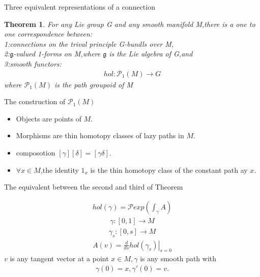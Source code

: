 \documentclass[12pt,aspectratio=53,mathserif]{beamer}
\begin{document}
\begin{frame}
     {Three equivalent representations of a connection}
     \newtheorem{mythm}{Theorem}
     \begin{mythm}\label{cc}
        For any Lie group G and any smooth manifold M,there is a one to one correspondence between:\\
        1:connections on the trival principle G-bundls over M,\\
        2:$\mathfrak{g}$-valued 1-forms on M,where $\mathfrak{g}$ is the Lie algebra of G,and\\
        3:smooth functors:
    \begin{align*}
    hol :\mathcal{P}_1(M) \rightarrow G
\end{align*}
       where $\mathcal{P}_1(M)$ is the path groupoid of M
     \end{mythm}
\end{frame}

\begin{frame}
    {The construction of $\mathcal{P}_1(M)$ }
    \begin{itemize}
        \item Objects are points of $M$.
        \item Morphisms are thin homotopy classes of lazy paths in $M$.
        \item composotion $[\gamma][\delta]=[\gamma \delta]$.
        \item $\forall x \in M$,the identity $1_x$ is the thin homotopy class of the constant path ay $x$.
         \end{itemize}
     \item {}
     \item {}
\end{frame}

\begin{frame}
    {The equivalent between the second and third of Theorem }
    \begin{enumerate}
         \begin{align}
             hol(\gamma)=\mathcal{P}exp(\int_{\gamma} A)
            \end{align}
        \begin{align}
            \gamma:[0,1] \rightarrow M
        \end{align}
             \begin{align}
                \gamma_s:[0,s] \rightarrow M
             \end{align}
             \begin{align}
                 A(v)=\left.\frac{d}{ds}hol(\gamma_s)\right|_{s=0}
             \end{align}
        $v$ is any tangent vector at a point $x \in M,\gamma $ is any smooth path with
        \begin{align}
            \gamma(0)=x,\gamma'(0)=v.
        \end{align}
    \end{enumerate}
        \end{frame}
    
\end{document}
